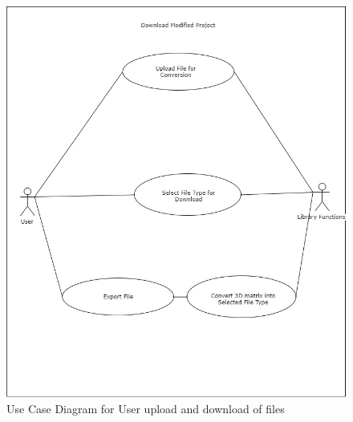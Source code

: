 \documentclass[english]{article}
\begin{document}
			 	\begin{figure}[h]
			 		\includegraphics[width=\textwidth]{Use Cases/FileDownload.jpg}
			 		\caption{Use Case Diagram for User upload and download of files }
			 	\end{figure}
			 	
\end{document}
